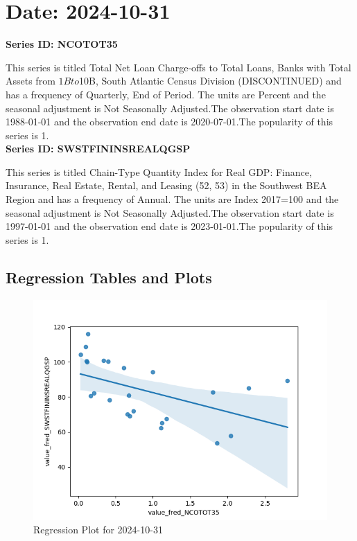 \section{Date: 2024-10-31}
\noindent \textbf{Series ID: NCOTOT35} 

\noindent This series is titled Total Net Loan Charge-offs to Total Loans, Banks with Total Assets from $1B to $10B, South Atlantic Census Division (DISCONTINUED) and has a frequency of Quarterly, End of Period. The units are Percent and the seasonal adjustment is Not Seasonally Adjusted.The observation start date is 1988-01-01 and the observation end date is 2020-07-01.The popularity of this series is 1. \\ 

\noindent \textbf{Series ID: SWSTFININSREALQGSP} 

\noindent This series is titled Chain-Type Quantity Index for Real GDP: Finance, Insurance, Real Estate, Rental, and Leasing (52, 53) in the Southwest BEA Region and has a frequency of Annual. The units are Index 2017=100 and the seasonal adjustment is Not Seasonally Adjusted.The observation start date is 1997-01-01 and the observation end date is 2023-01-01.The popularity of this series is 1. \\ 

\subsection{Regression Tables and Plots}


\begin{figure}
\centering
\includegraphics[scale = 0.9]{plots/plot_2024-10-31.png}
\caption{Regression Plot for 2024-10-31}
\end{figure}
\newpage
